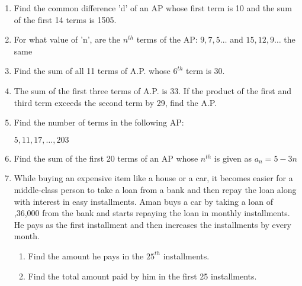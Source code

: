 \documentclass{article}
\begin{document}
\begin{enumerate}
    \item Find the common difference 'd' of an AP whose first term is 10 and the sum of the first 14 terms is 1505.
    \item For what value of 'n', are the $n^{th}$ terms of the AP: $9,7,5\dots$ and $15,12,9\dots$ the same

    \item Find the sum of all 11 terms of A.P. whose $6^{th}$ term is 30.
    \item The sum of the first three terms of A.P. is 33. If the product of the first and third term exceeds the second term by 29, find the A.P.

    \item Find the number of terms in the following AP:
    
    $5,11,17,\dots,203$

    \item Find the sum of the first 20 terms of an AP whose $n^{th}$ is given as $a_n= 5 - 3n$
   

    \item While buying an expensive item like a house or a car, it becomes easier for a middle-class person to take a loan from a bank and then repay the loan along with interest in easy installments. Aman buys a car by taking a loan of ,36,000 from the bank and starts repaying the loan in monthly installments. He pays  as the first installment and then increases the installments by  every month.     
    \begin{enumerate}
    
 \item Find the amount he pays in the $25^{th}$ installments.
    \item Find the total amount paid by him in the first 25 installments.

\end{enumerate}

\end{enumerate}
\end{document}
